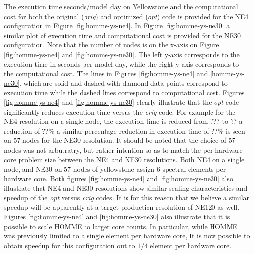 
The execution time seconds/model day on Yellowstone and the computational cost for both the original ({\em orig})  and optimized ({\em opt}) code is provided for the NE4 configuration in Figure \ref{fig:homme-ys-ne4}. In Figure \ref{fig:homme-ys-ne30} a similar plot of execution time and computational cost is provided for the NE30 configuration.  Note that the number of nodes is on the x-axis on Figure \ref{fig:homme-ys-ne4} and \ref{fig:homme-ys-ne30}.  The left y-axis corresponds to the execution time in seconds per model day, while the right y-axis corresponds to the computational cost. The lines in Figures \ref{fig:homme-ys-ne4} and \ref{homme-ys-ne30}, which are solid and dashed with diamond data points correspond to execution time while the dashed lines  correspond to computational cost.  Figures  \ref{fig:homme-ys-ne4} and \ref{fig:homme-ys-ne30} clearly illustrate that the {\em opt} code significantly reduces execution time versus the {\em orig} code.  For example for the NE4 resolution on a single node, the execution time is reduced from ??? to ?? a reduction of ??\% a similar percentage reduction in execution time of ??\% is seen on 57 nodes for the NE30 resolution.  It should be  noted that the choice of 57 nodes was not arbutratry, but rather intention so as to match the per hardware core problem size between the NE4 and NE30 resolutions.  Both  NE4 on a single node, and NE30 on 57 nodes of yellowstone assign 6 spectral elements per hardware core.  Both figures \ref{fig:homme-ys-ne4} and \ref{fig:homme-ys-ne30} also illustrate that NE4 and NE30 resolutions show similar scaling characteristics and speedup of the {\em opt} versus {\em orig} codes. It is for this reason that we believe a similar speedup will be apparently at a target production resolution of NE120 as well.   Figures \ref{fig:homme-ys-ne4} and \ref{fig:homme-ys-ne30} also illustrate that it is possible to scale HOMME to larger core counts.  In particular, while HOMME was previously limited to a single element per hardware core, It is now possible to obtain speedup for this configuration out to $1/4$ element per hardware core.
 
